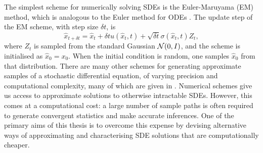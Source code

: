 The simplest scheme for numerically solving SDEs is the Euler-Maruyama (EM) method, which is analogous to the Euler method for ODEs \citep{KloedenPlaten_1992_NumericalSolutionStochastic}.
The update step of the EM scheme, with step size \(\delta t\), is
\begin{equation}
	\hat{x}_{t + \delta t} = \hat{x}_{t} + \delta t u\!\left(\hat{x}_t, t\right) + \sqrt{\delta t} \sigma\!\left(\hat{x}_t, t\right) Z_t,
	\label{eqn:em_step}
\end{equation}
where \(Z_t\) is sampled from the standard Gaussian \(\mathcal{N}\!\left(0,I\right)\), and the scheme is initialised as \(\hat{x}_0 = x_0\).
When the initial condition is random, one samples \(\hat{x}_0\) from that distribution.
There are many other schemes for generating approximate samples of a stochastic differential equation, of varying precision and computational complexity, many of which are given in \citet{KloedenPlaten_1992_NumericalSolutionStochastic}.
Numerical schemes give us access to approximate solutions to otherwise intractable SDEs.
However, this comes at a computational cost: a large number of sample paths is often required to generate convergent statistics and make accurate inferences.
One of the primary aims of this thesis is to overcome this expense by devising alternative ways of approximating and characterising SDE solutions that are computationally cheaper.






